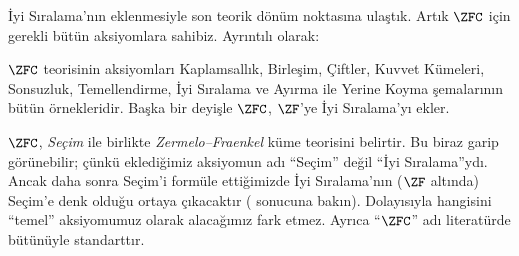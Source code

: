 \documentclass[../../../include/open-logic-section]{subfiles}
\begin{document}

İyi Sıralama'nın eklenmesiyle son teorik dönüm noktasına ulaştık. Artık
$\ZFC$ için gerekli bütün aksiyomlara sahibiz. Ayrıntılı olarak:

\begin{defn}
$\ZFC$ teorisinin aksiyomları Kaplamsallık, Birleşim, Çiftler, Kuvvet
Kümeleri, Sonsuzluk, Temellendirme, İyi Sıralama ve Ayırma ile Yerine Koyma
şemalarının bütün örnekleridir. Başka bir deyişle $\ZFC$, $\ZF$'ye İyi
Sıralama'yı ekler.
\end{defn}

$\ZFC$, \emph{Seçim} ile birlikte \emph{Zermelo--Fraenkel} küme teorisini
belirtir. Bu biraz garip görünebilir; çünkü eklediğimiz aksiyomun adı
``Seçim'' değil ``İyi Sıralama''ydı. Ancak daha sonra Seçim'i formüle
ettiğimizde İyi Sıralama'nın ($\ZF$ altında) Seçim'e denk olduğu ortaya
çıkacaktır ( sonucuna bakın).
Dolayısıyla hangisini ``temel'' aksiyomumuz olarak alacağımız fark etmez.
Ayrıca ``$\ZFC$'' adı literatürde bütünüyle standarttır.
\end{document}
